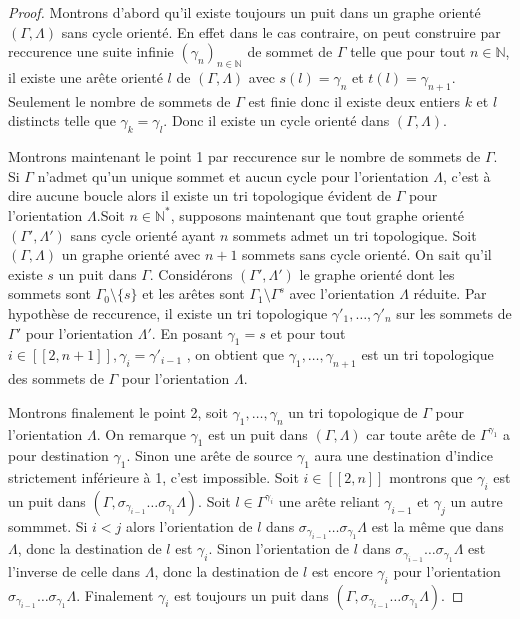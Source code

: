 \documentclass[a4paper,10pt]{article}
\begin{document}
\begin{proof}
  Montrons d'abord qu'il existe toujours un puit dans un graphe orienté $(\Gamma,\Lambda)$ sans cycle orienté. En effet dans le cas contraire, on peut construire par reccurence une suite infinie $(\gamma_{n})_{n\in \mathbb N}$ de sommet de $\Gamma$ telle que pour tout $n \in \mathbb N$, il existe une arête orienté $l$ de $(\Gamma,\Lambda)$ avec $s(l) = \gamma_{n}$ et $t(l) = \gamma_{n+1}$. Seulement le nombre de sommets de $\Gamma$ est finie donc il existe deux entiers $k$ et $l$ distincts telle que $\gamma_{k} = \gamma_{l}$. Donc il existe un cycle orienté dans $(\Gamma, \Lambda)$.

Montrons maintenant le point 1 par reccurence sur le nombre de sommets de $\Gamma$. Si $\Gamma$ n'admet qu'un unique sommet et aucun cycle pour l'orientation $\Lambda$, c'est à dire aucune boucle alors il existe un tri topologique évident de $\Gamma$ pour l'orientation $\Lambda$.Soit $n \in \mathbb N^{*}$, supposons maintenant que tout graphe orienté $(\Gamma',\Lambda')$ sans cycle orienté ayant $n$ sommets admet un tri topologique. Soit $(\Gamma,\Lambda)$ un graphe orienté avec $n+1$ sommets sans cycle orienté. On sait qu'il existe $s$ un puit dans $\Gamma$. Considérons $(\Gamma',\Lambda')$ le graphe orienté dont les sommets sont $\Gamma_{0} \setminus \{s\}$ et les arêtes sont $\Gamma_{1} \setminus \Gamma^{s}$ avec l'orientation $\Lambda$ réduite. Par hypothèse de reccurence, il existe un tri topologique $\gamma'_{1}, \dots, \gamma'_{n}$ sur les sommets de $\Gamma'$ pour l'orientation $\Lambda'$. En posant $\gamma_{1} = s$ et pour tout $i \in [\![2,n+1]\!], \gamma_{i} = \gamma'_{i-1}$ , on obtient que $\gamma_{1}, \dots, \gamma_{n+1}$ est un tri topologique des sommets de $\Gamma$ pour l'orientation $\Lambda$. 

Montrons finalement le point 2, soit $\gamma_{1}, \dots, \gamma_{n}$ un tri topologique de $\Gamma$ pour l'orientation $\Lambda$. On remarque $\gamma_{1}$ est un puit dans $(\Gamma,\Lambda)$ car toute arête de $\Gamma^{\gamma_{1}}$ a pour destination $\gamma_{1}$. Sinon une arête de source $\gamma_{1}$ aura une destination d'indice strictement inférieure à 1, c'est impossible. Soit $i \in [\![2,n]\!]$ montrons que $\gamma_{i}$ est un puit dans $(\Gamma,\sigma_{\gamma_{i-1}} \dots \sigma_{\gamma_{1}} \Lambda)$. Soit $l \in \Gamma^{\gamma_{i}}$ une arête reliant $\gamma_{i-1}$ et $\gamma_{j}$ un autre sommmet. Si $i<j$ alors l'orientation de $l$ dans $\sigma_{\gamma_{i-1}} \dots \sigma_{\gamma_{1}} \Lambda$ est la même que dans $\Lambda$, donc la destination de $l$ est $\gamma_{i}$. Sinon l'orientation de $l$ dans $\sigma_{\gamma_{i-1}} \dots \sigma_{\gamma_{1}} \Lambda$ est l'inverse de celle dans $\Lambda$, donc la destination de $l$ est encore $\gamma_{i}$ pour l'orientation $\sigma_{\gamma_{i-1}} \dots \sigma_{\gamma_{1}} \Lambda$. Finalement $\gamma_{i}$ est toujours un puit dans $(\Gamma,\sigma_{\gamma_{i-1}} \dots \sigma_{\gamma_{1}} \Lambda)$.
\end{proof}
\end{document}
